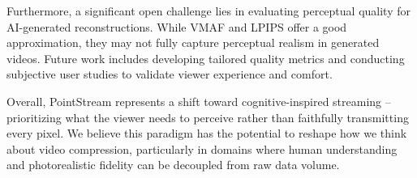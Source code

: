 \documentclass[manuscript, screen]{acmart}
\begin{document}
Furthermore, a significant open challenge lies in evaluating perceptual quality for AI-generated reconstructions. While VMAF and LPIPS offer a good approximation, they may not fully capture perceptual realism in generated videos. Future work includes developing tailored quality metrics and conducting subjective user studies to validate viewer experience and comfort.

Overall, PointStream represents a shift toward cognitive-inspired streaming -- prioritizing what the viewer needs to perceive rather than faithfully transmitting every pixel. We believe this paradigm has the potential to reshape how we think about video compression, particularly in domains where human understanding and photorealistic fidelity can be decoupled from raw data volume.









\end{document}
